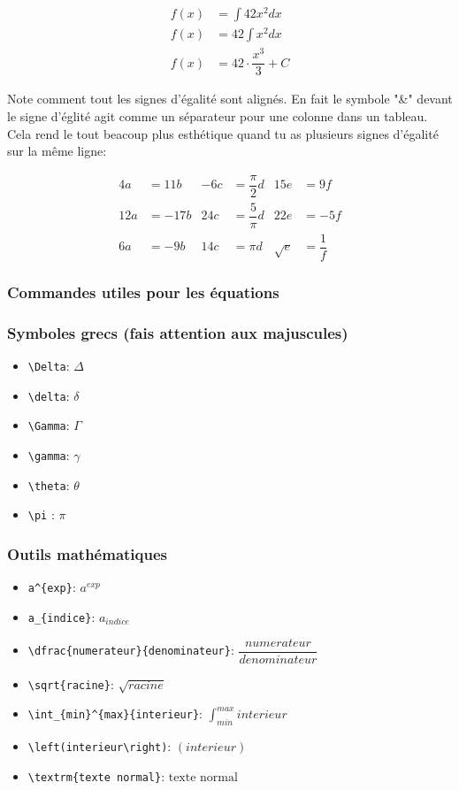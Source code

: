 \documentclass[a4paper, 10pt]{article}
\begin{document}
\begin{align}
  f(x) &= \int{42x^2 } dx \\
  f(x) &= 42\int{x^2 } dx \\
  f(x) &= 42 \cdot \dfrac{x^3}{3} + C
\end{align}

Note comment tout les signes d'égalité sont alignés. En fait le symbole "\&"
devant le signe d'églité agit comme un séparateur pour une colonne dans un
tableau. Cela rend le tout beacoup plus esthétique quand tu as plusieurs
signes d'égalité sur la même ligne:

\begin{align}
  4a  &= 11b  & -6c  &= \dfrac{\pi}{2}d & 15e      &= 9f \\
  12a &= -17b & 24c  &= \dfrac{5}{\pi}d & 22e      &= -5f \\
  6a  &= -9b  & 14c  &= \pi d           & \sqrt{e} &= \dfrac{1}{f}
\end{align}

\subsubsection{Commandes utiles pour les équations}

\subsubsection{Symboles grecs (fais attention aux majuscules)}

\begin{itemize}
  \item \verb+\Delta+: $\Delta$
  \item \verb+\delta+: $\delta$
  \item \verb+\Gamma+: $\Gamma$
  \item \verb+\gamma+: $\gamma$
  \item \verb+\theta+: $\theta$
  \item \verb+\pi+   : $\pi$
\end{itemize}

\subsubsection{Outils mathématiques}

\begin{itemize}
  \item \verb+a^{exp}+:
      $a^{exp}$
  \item \verb+a_{indice}+:
      $a_{indice}$
  \item \verb+\dfrac{numerateur}{denominateur}+:
      $\dfrac{numerateur}{denominateur}$
  \item \verb+\sqrt{racine}+:
      $\sqrt{racine}$
  \item \verb+\int_{min}^{max}{interieur}+:
      $\int_{min}^{max}{interieur}$
  \item \verb+\left(interieur\right)+:
      $\left(interieur\right)$
  \item \verb+\textrm{texte normal}+:
      $\textrm{texte normal}$
\end{itemize}
\end{document}

